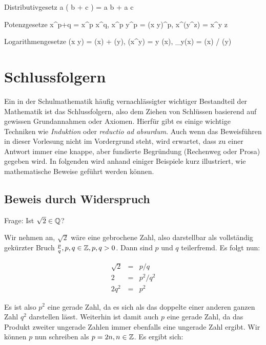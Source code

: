 \begin{Nequation}{Distributivgesetz}
	a \cdot ( b + c ) = a \cdot b + a \cdot c
	\label{eq:Distributivgesetz}
\end{Nequation}

\begin{Nequation}{Potenzgesetze}
	x^{p+q} = x^p \cdot x^q, x^p \cdot y^p = (x \cdot y)^p, x^{(y^z)} = x^{y \cdot z}
	\label{eq:Potenzgesetze}
\end{Nequation}

\begin{Nequation}{Logarithmengesetze}
	\ln(x \cdot y) = \ln(x) + \ln(y), \ln(x^y) = y \ln(x), \log_y(x) = \ln(x) / \ln(y)
	\label{eq:Logarithmengesetze}
\end{Nequation}

\section{Schlussfolgern}

Ein in der Schulmathematik häufig vernachlässigter wichtiger Bestandteil der Mathematik ist das Schlussfolgern, also dem Ziehen von Schlüssen basierend auf gewissen Grundannahmen oder Axiomen. Hierfür
gibt es einige wichtige Techniken wie \emph{Induktion} oder \emph{reductio ad absurdum}. Auch wenn das Beweisführen in dieser Vorlesung nicht im Vordergrund steht, wird erwartet, dass zu einer Antwort
immer eine knappe, aber fundierte Begründung (Rechenweg oder Prosa) gegeben wird. In folgenden wird anhand einiger Beispiele kurz illustriert, wie mathematische Beweise geführt werden können.

\subsection{Beweis durch Widerspruch}

Frage: Ist $\sqrt{2}\in\mathbb{Q}$?

Wir nehmen an, $\sqrt{2}$ wäre eine gebrochene Zahl, also darstellbar als vollständig gekürzter Bruch $\frac{p}{q}, p,q\in\mathbb{Z}, p,q>0$. Dann sind $p$ und $q$ teilerfremd. Es folgt nun:

\begin{eqnarray}
  \sqrt{2} & = & p / q \\
         2 & = & p^2 / q^2 \\
     2 q^2 & = & p^2
\end{eqnarray}

Es ist also $p^2$ eine gerade Zahl, da es sich als das doppelte einer anderen ganzen Zahl $q^2$ darstellen lässt. Weiterhin ist damit auch $p$ eine gerade Zahl, da das Produkt zweiter ungerade Zahlen
immer ebenfalls eine ungerade Zahl ergibt. Wir können $p$ nun schreiben als $p = 2 n, n\in \mathbb{Z}$. Es ergibt sich:

